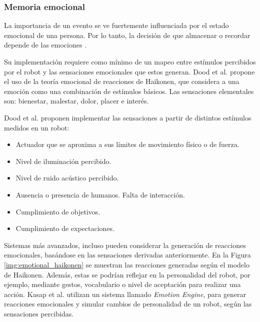 %



\subsubsection{Memoria emocional}
La importancia de un evento se ve fuertemente influenciada por el estado emocional de una persona. Por lo tanto, la decisión de que almacenar o recordar depende de las emociones \cite{Deutsch2008}.

Su implementación requiere como mínimo de un mapeo entre estímulos percibidos por el robot y las sensaciones emocionales que estos generan. Dood et al. \cite{Dodd2005} propone el uso de la teoría emocional de reacciones de Haikonen, que considera a una emoción como una combinación de estímulos básicos. Las sensaciones elementales son: bienestar, malestar, dolor, placer e interés.

Dood et al. proponen implementar las sensaciones a partir de distintos estímulos medidos en un robot:

\begin{itemize}[topsep=0pt]
	\setlength\itemsep{0.2em}
	\item Actuador que se aproxima a sus límites de movimiento físico o de fuerza. 
	\item Nivel de iluminación percibido.
	\item Nivel de ruido acústico percibido.
	\item Ausencia o presencia de humanos. Falta de interacción.
	\item Cumplimiento de objetivos.
	\item Cumplimiento de expectaciones.
\end{itemize}


Sistemas más avanzados, incluso pueden considerar la generación de reacciones emocionales, basándose en las sensaciones derivadas anteriormente. En la Figura \ref{img:emotional_haikonen} se muestran las reacciones generadas según el modelo de Haikonen. Además, estas se podrían reflejar en la personalidad del robot, por ejemplo, mediante gestos, vocabulario o nivel de aceptación para realizar una acción. Kasap et al. \cite{Kasap2010} utilizan un sistema llamado \textit{Emotion Engine}, para generar reacciones emocionales y simular cambios de personalidad de un robot, según las sensaciones percibidas.

